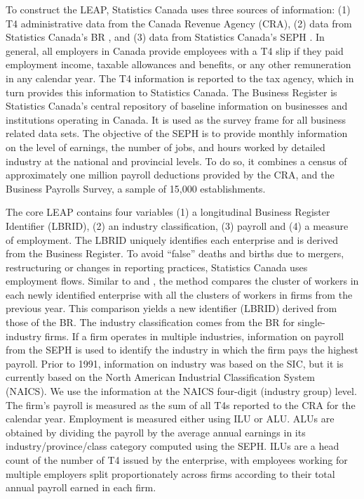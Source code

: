 \documentclass[10pt]{article}
\begin{document}
To construct the \ac{LEAP}, Statistics Canada uses three sources of information: (1) T4 administrative data  from the Canada Revenue Agency (CRA), (2) data from Statistics Canada's \acl{BR} \citep{StatisticsCanada2019a}, and (3) data from  Statistics Canada's \acf{SEPH} \citep{StatisticsCanada2019b}. 
In general, all employers in Canada provide employees with a T4 slip if they paid employment income, taxable allowances and benefits, or any other remuneration in any calendar year. The T4 information is reported to the tax agency, which in turn provides this information to Statistics Canada. 
The Business Register is Statistics Canada's central repository of baseline information on businesses and institutions operating in Canada. It is used as the survey frame for all business related data sets.
The objective of the \ac{SEPH} is to provide monthly information on the level of earnings, the number of jobs, and hours worked by detailed industry at the national and provincial levels. To do so, it combines a census of approximately one million payroll deductions provided by the CRA, and the Business Payrolls Survey, a sample of 15,000 establishments.  


The core \ac{LEAP}  contains four variables (1) a longitudinal Business Register Identifier (LBRID), (2) an industry classification, (3) payroll and (4) a measure of employment. 
The LBRID uniquely identifies each enterprise and is derived from the Business Register. To avoid ``false'' deaths and births due to mergers, restructuring or changes in reporting practices, Statistics Canada uses employment flows. Similar to \citet{BenedettoEtAl2007} and \citet{RePEc:iab:iabfme:201006_en}, the method  compares the cluster of workers in each newly identified enterprise with all the clusters of workers in firms from the previous year. This comparison yields a new identifier (LBRID) derived from those of the \ac{BR}.
The industry classification comes from the \ac{BR} for single-industry firms. If a firm operates in multiple industries, information on payroll from the \ac{SEPH} is used to identify the industry in which the firm pays the highest payroll. Prior to 1991, information on industry was based on the SIC,  but it is currently based on the  North American Industrial Classification System (NAICS). We use the information at the NAICS four-digit (industry group) level. 
The firm's payroll is measured as the sum of all T4s  reported to the CRA for the calendar year.
Employment is measured either using \ac{ILU} or \ac{ALU}. \acp{ALU} are obtained by dividing the payroll by the average annual earnings in its industry/province/class category computed using the \ac{SEPH}. \acp{ILU} are a head count of the number of T4 issued by the enterprise, with employees working for multiple employers split proportionately across firms according to their total annual payroll earned in each firm. 
\end{document}
